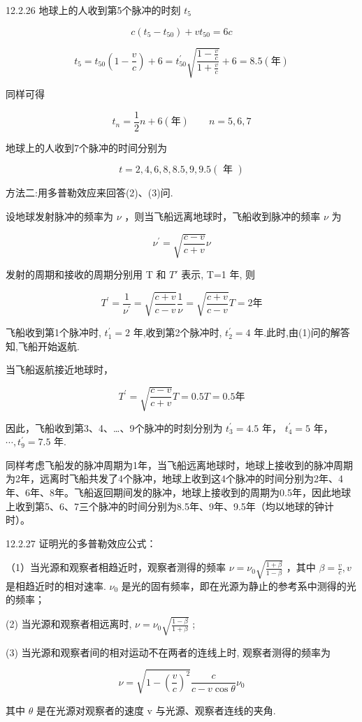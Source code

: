 \begin{problem}{12.2.26}
地球上的人收到第5个脉冲的时刻 $t_5$ 

\[
c \left(t _ {5} - t _ {5 0}\right) + v t _ {5 0} = 6 c
\]

\[
t _ {5} = t _ {5 0} \left(1 - \frac {v}{c}\right) + 6 = t _ {5 0} ^ {\prime} \sqrt {\frac {1 - \frac {v}{c}}{1 + \frac {v}{c}}} + 6 = 8. 5 (\text {年})
\]

同样可得

\[
t _ {n} = \frac {1}{2} n + 6 (\text {年}) \qquad n = 5, 6, 7
\]

地球上的人收到7个脉冲的时间分别为

\[
t = 2, 4, 6, 8, 8. 5, 9, 9. 5 (\text { 年 })
\]

方法二:用多普勒效应来回答(2)、(3)问.

设地球发射脉冲的频率为 $\nu$ ，则当飞船远离地球时，飞船收到脉冲的频率 $\nu$ 为

\[
\nu^ {\prime} = \sqrt {\frac {c - v}{c + v}} \nu
\]

发射的周期和接收的周期分别用 T 和 $T'$ 表示, T=1 年, 则

\[
T ^ {\prime} = \frac {1}{\nu^ {\prime}} = \sqrt {\frac {c + v}{c - v}} \frac {1}{\nu} = \sqrt {\frac {c + v}{c - v}} T = 2 \text {年}
\]

飞船收到第1个脉冲时, $t_{1}^{\prime}=2$ 年,收到第2个脉冲时, $t_{2}^{\prime}=4$ 年.此时,由(1)问的解答知,飞船开始返航.

当飞船返航接近地球时，

\[
T ^ {\prime} = \sqrt {\frac {c - v}{c + v}} T = 0. 5 T = 0. 5 \text {年}
\]

因此，飞船收到第3、4、…、9个脉冲的时刻分别为 $t_{3}^{\prime}=4.5$ 年， $t_{4}^{\prime}=5$ 年， $\cdots,t_{9}^{\prime}=7.5$ 年.

同样考虑飞船发的脉冲周期为1年，当飞船远离地球时，地球上接收到的脉冲周期为2年，远离时飞船共发了4个脉冲，地球上收到这4个脉冲的时间分别为2年、4年、6年、8年。飞船返回期间发的脉冲，地球上接收到的周期为0.5年，因此地球上收到第5、6、7三个脉冲的时间分别为8.5年、9年、9.5年（均以地球的钟计时）。
\end{problem}
\clearpage


\begin{problem}{12.2.27}
证明光的多普勒效应公式：

（1）当光源和观察者相趋近时，观察者测得的频率 $\nu = \nu_0\sqrt{\frac{1 + \beta}{1 - \beta}}$ ，其中 $\beta = \frac{v}{c}, v$ 是相趋近时的相对速率. $\nu_0$ 是光的固有频率，即在光源为静止的参考系中测得的光的频率；

(2) 当光源和观察者相远离时, $\nu=\nu_{0}\sqrt{\frac{1-\beta}{1+\beta}}$ ;

(3) 当光源和观察者间的相对运动不在两者的连线上时, 观察者测得的频率为

\[
\nu = \sqrt {1 - \left(\frac {v}{c}\right) ^ {2}} \frac {c}{c - v \cos \theta} \nu_ {0}
\]

其中 $\theta$ 是在光源对观察者的速度 v 与光源、观察者连线的夹角.
\end{problem}
\clearpage


